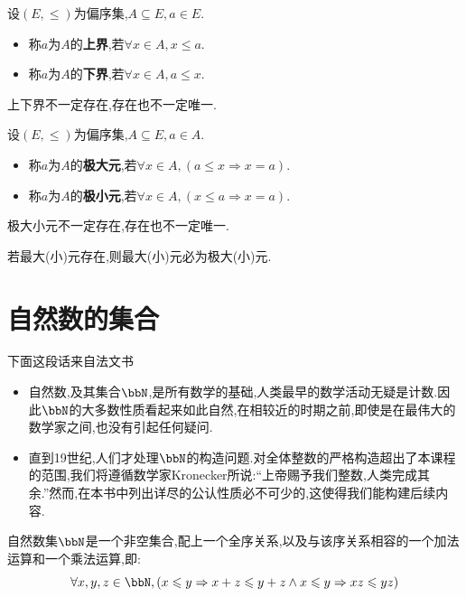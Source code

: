 \begin{deff}
    设$(E, \leqslant)$为偏序集,$A \subseteq E, a \in E$.
    \begin{itemize}
        \item 称$a$为$A$的\textbf{上界},若$\forall x \in A, x \leqslant a$.
        \item 称$a$为$A$的\textbf{下界},若$\forall x \in A, a \leqslant x$.
    \end{itemize}
\end{deff}

\begin{rqq}
    上下界不一定存在,存在也不一定唯一.
\end{rqq}

\begin{deff}
    设$(E, \leqslant)$为偏序集,$A \subseteq E, a \in A$.
    \begin{itemize}
        \item 称$a$为$A$的\textbf{极大元},若$\forall x \in A, (a \leqslant x \Rightarrow x = a)$.
        \item 称$a$为$A$的\textbf{极小元},若$\forall x \in A, (x \leqslant a \Rightarrow x = a)$.
    \end{itemize}
\end{deff}

\begin{rqq}
    极大小元不一定存在,存在也不一定唯一.

    若最大(小)元存在,则最大(小)元必为极大(小)元.
\end{rqq}

\section{自然数的集合}

下面这段话来自法文书
\begin{itemize}
    \item 自然数,及其集合$\bbN$,是所有数学的基础,人类最早的数学活动无疑是计数.因此$\bbN$的大多数性质看起来如此自然,在相较近的时期之前,即使是在最伟大的数学家之间,也没有引起任何疑问.
    \item 直到19世纪,人们才处理$\bbN$的构造问题.对全体整数的严格构造超出了本课程的范围,我们将遵循数学家Kronecker所说:``上帝赐予我们整数,人类完成其余.''然而,在本书中列出详尽的公认性质必不可少的,这使得我们能构建后续内容.
\end{itemize}

自然数集$\bbN$是一个非空集合,配上一个全序关系,以及与该序关系相容的一个加法运算和一个乘法运算,即:\[ \forall x, y ,z \in \bbN, (x \leqslant y \Rightarrow x + z \leqslant y + z \land x \leqslant y \Rightarrow xz \leqslant yz) \]

